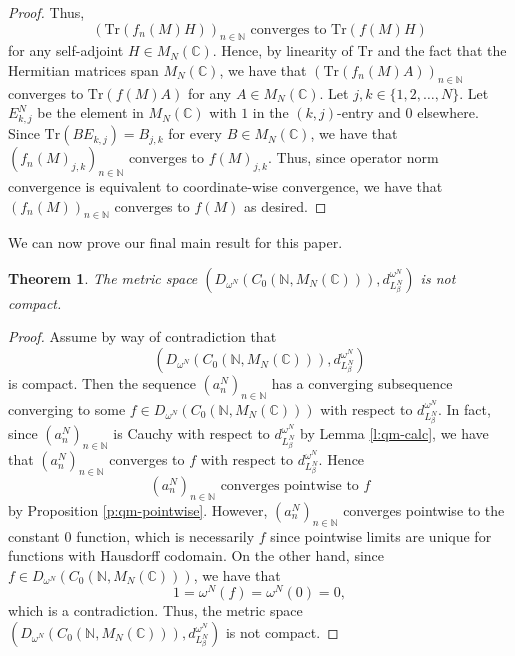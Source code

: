 \documentclass{amsart}
\theoremstyle{plain}
\newtheorem{theorem}{Theorem}[section]
\theoremstyle{definition}
\theoremstyle{remark}
\numberwithin{equation}{section}
\newcommand{\be}{{\beta}}
\newcommand{\om}{{\omega}}
\newcommand{\N}{{\mathds{N}}}
\newcommand{\C}{{\mathds{C}}}
\begin{document}
\begin{proof}
   Thus, \[(\mathrm{Tr}(f_n(M)H))_{n\in \N} \text{ converges to } \mathrm{Tr}(f(M)H)\] for any   self-adjoint $H\in M_N(\C)$. Hence, 
by linearity of $\mathrm{Tr}$ and the fact that the Hermitian matrices span $M_N(\C)$, we have that $(\mathrm{Tr}(f_n(M)A))_{n\in \N}$ converges to $\mathrm{Tr}(f(M)A)$ for any $A\in M_N(\C)$. Let $j,k\in \{1,2,\ldots,N\}$.  Let $E_{k,j}^N$ be the element in $M_N(\C)$ with $1$ in the $(k,j)$-entry and $0$ elsewhere. Since $\mathrm{Tr}(BE_{k,j})=B_{j,k}$ for every $B\in M_N(\C)$, we have that $(f_n(M)_{j,k})_{n\in \N}$ converges to $f(M)_{j,k}$. Thus, since operator norm convergence is equivalent to coordinate-wise convergence, we have that $(f_n(M))_{n\in \N}$ converges to $f(M)$ as desired.
\end{proof}

We can now prove our final main result for this paper.
\begin{theorem}\label{t:non-compact}
    The metric space $(D_{\om^N}(C_0(\N, M_N(\C))), d_{L^N_\be}^{\om^N})$ is not compact.
\end{theorem}
\begin{proof}
    Assume by way of contradiction that \[(D_{\om^N}(C_0(\N, M_N(\C))), d_{L^N_\be}^{\om^N})\] is compact. Then the sequence $(a^N_n)_{n\in \N}$ has a converging subsequence converging to some $f\in D_{\om^N}(C_0(\N, M_N(\C)))$ with respect to $ d_{L^N_\be}^{\om^N}. $  In fact, since $(a^N_n)_{n\in \N}$ is Cauchy with respect to $d_{L^N_\be}^{\om^N}$ by Lemma \ref{l:qm-calc}, we have that $(a^N_n)_{n\in \N}$ converges to $f$ with respect to $d_{L^N_\be}^{\om^N}$. Hence \[(a^N_n)_{n\in \N} \text{ converges pointwise to } f\] by Proposition \ref{p:qm-pointwise}. However, $(a^N_n)_{n\in \N}$ converges pointwise to the constant $0$ function, which is necessarily $f$ since pointwise limits are unique for functions with Hausdorff codomain. On the other hand,  since $f\in D_{\om^N}(C_0(\N, M_N(\C)))$, we have  that   \[1=\om^N(f)=\om^N(0)=0,\] which is a contradiction. Thus, the metric space $(D_{\om^N}(C_0(\N, M_N(\C))), d_{L^N_\be}^{\om^N})$ is not compact. 
\end{proof}

 





 \vfill
\end{document}
